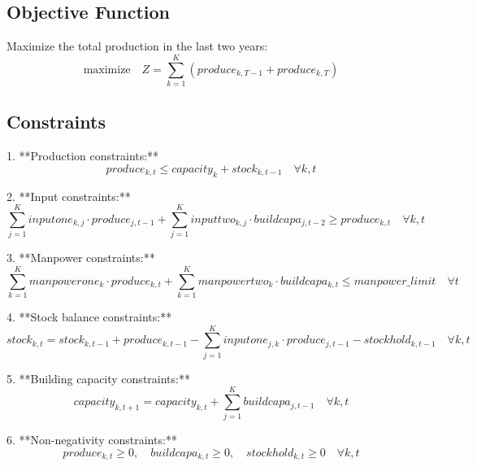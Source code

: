 \documentclass{article}
\begin{document}
\subsection*{Objective Function}
Maximize the total production in the last two years:
\[
\text{maximize} \quad Z = \sum_{k=1}^{K} (produce_{k,T-1} + produce_{k,T})
\]

\subsection*{Constraints}
1. **Production constraints:**
\[
produce_{k,t} \leq capacity_{k} + stock_{k,t-1} \quad \forall k, t
\]

2. **Input constraints:**
\[
\sum_{j=1}^{K} inputone_{k,j} \cdot produce_{j,t-1} + \sum_{j=1}^{K} inputtwo_{k,j} \cdot buildcapa_{j,t-2} \geq produce_{k,t} \quad \forall k, t
\]

3. **Manpower constraints:**
\[
\sum_{k=1}^{K} manpowerone_{k} \cdot produce_{k,t} + \sum_{k=1}^{K} manpowertwo_{k} \cdot buildcapa_{k,t} \leq manpower\_limit \quad \forall t
\]

4. **Stock balance constraints:**
\[
stock_{k,t} = stock_{k,t-1} + produce_{k,t-1} - \sum_{j=1}^{K} inputone_{j,k} \cdot produce_{j,t-1} - stockhold_{k,t-1} \quad \forall k, t
\]

5. **Building capacity constraints:**
\[
capacity_{k,t+1} = capacity_{k,t} + \sum_{j=1}^{K} buildcapa_{j,t-1} \quad \forall k, t
\]

6. **Non-negativity constraints:**
\[
produce_{k,t} \geq 0, \quad buildcapa_{k,t} \geq 0, \quad stockhold_{k,t} \geq 0 \quad \forall k, t
\]
\end{document}
